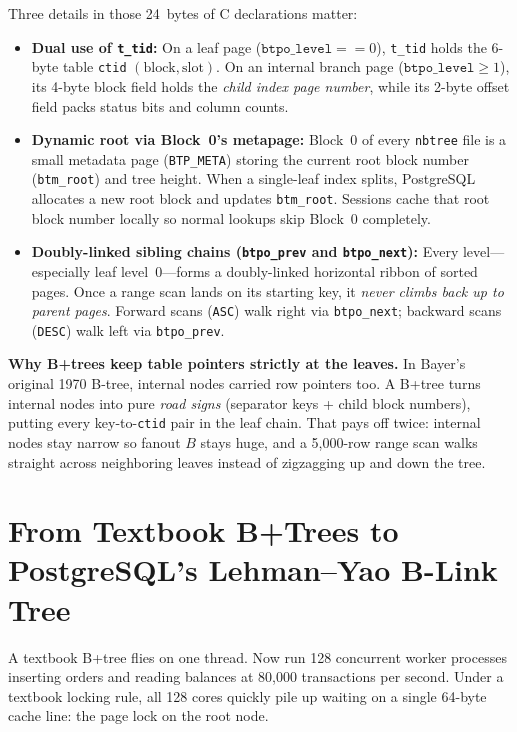 Three details in those 24~bytes of C declarations matter:
\begin{itemize}
  \item \textbf{Dual use of \texttt{t\_tid}:} On a leaf page ($\texttt{btpo\_level} == 0$), \texttt{t\_tid} holds the 6-byte table \texttt{ctid} $(\text{block}, \text{slot})$. On an internal branch page ($\texttt{btpo\_level} \ge 1$), its 4-byte block field holds the \emph{child index page number}, while its 2-byte offset field packs status bits and column counts.
  \item \textbf{Dynamic root via Block~0's metapage:} Block~0 of every \texttt{nbtree} file is a small metadata page (\texttt{BTP\_META}) storing the current root block number (\texttt{btm\_root}) and tree height. When a single-leaf index splits, PostgreSQL allocates a new root block and updates \texttt{btm\_root}. Sessions cache that root block number locally so normal lookups skip Block~0 completely.
  \item \textbf{Doubly-linked sibling chains (\texttt{btpo\_prev} and \texttt{btpo\_next}):} Every level---especially leaf level~0---forms a doubly-linked horizontal ribbon of sorted pages. Once a range scan lands on its starting key, it \emph{never climbs back up to parent pages}. Forward scans (\texttt{ASC}) walk right via \texttt{btpo\_next}; backward scans (\texttt{DESC}) walk left via \texttt{btpo\_prev}.
\end{itemize}

\begin{intuitionbox}
\textbf{Why B+trees keep table pointers strictly at the leaves.} In Bayer's original 1970 B-tree, internal nodes carried row pointers too. A B+tree turns internal nodes into pure \emph{road signs} (separator keys + child block numbers), putting every key-to-\texttt{ctid} pair in the leaf chain. That pays off twice: internal nodes stay narrow so fanout $B$ stays huge, and a 5,000-row range scan walks straight across neighboring leaves instead of zigzagging up and down the tree.
\end{intuitionbox}

\section{From Textbook B+Trees to PostgreSQL's Lehman--Yao B-Link Tree}
\label{sec:ch03-lehman-yao}

A textbook B+tree flies on one thread. Now run 128 concurrent worker processes inserting orders and reading balances at 80,000 transactions per second. Under a textbook locking rule, all 128 cores quickly pile up waiting on a single 64-byte cache line: the page lock on the root node.

